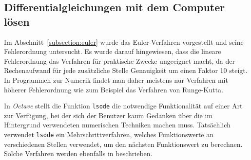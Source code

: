 %
%
%
\subsection{Differentialgleichungen mit dem Computer lösen\label{section:octave}}
Im Abschnitt~\ref{subsection:euler} wurde das Euler-Verfahren
vorgestellt und seine Fehlerordnung untersucht.
Es wurde darauf hingewiesen, dass die lineare Fehlerordnung das Verfahren
für praktische Zwecke ungeeignet macht, da der Rechenaufwand für jede
zusätzliche Stelle Genauigkeit um einen Faktor 10 steigt.
In Programmen zur Numerik findet man daher meistens nur Verfahren mit
höherer Fehlerordnung wie zum Beispiel das Verfahren von Runge-Kutta.

In {\em Octave} stellt die Funktion \texttt{lsode} die notwendige
Funktionalität auf einer Art zur Verfügung, bei der sich der
Benutzer kaum Gedanken über die im Hintergrund verwendeten
numerischen Techniken machen muss.
Tatsächlich verwendet \texttt{lsode} ein Mehrschrittverfahren, welches
Funktionswerte an verschiedenen Stellen verwendet, um den nächsten
Funktionswert zu berechnen.
Solche Verfahren werden ebenfalls in \cite{skript:mathsem-dgl} beschrieben.

